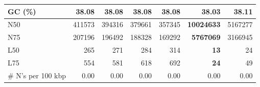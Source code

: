 \documentclass[12pt,a4paper]{article}
\begin{document}
\begin{table}[ht]
\begin{center}
\begin{tabular}{|l*{6}{|r}|}
GC (\%) & 38.08 & 38.08 & 38.08 & 38.08 & 38.03 & 38.11 \\ \hline
N50 & 411573 & 394316 & 379661 & 357345 & {\bf 10024633} & 5167277 \\ \hline
N75 & 207196 & 196492 & 188328 & 169292 & {\bf 5767069} & 3166945 \\ \hline
L50 & 265 & 271 & 284 & 314 & {\bf 13} & 24 \\ \hline
L75 & 554 & 581 & 618 & 692 & {\bf 24} & 49 \\ \hline
\# N's per 100 kbp & 0.00 & 0.00 & 0.00 & 0.00 & 0.00 & 0.00 \\ \hline
\end{tabular}
\end{center}
\end{table}
\end{document}

